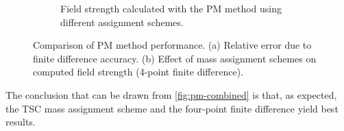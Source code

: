 \begin{figure}[htp]
\begin{subfigure}[t]{0.48\textwidth}
        \caption{Field strength calculated with the PM method using different assignment schemes.}
        \label{fig:pm-mass-assignment-field-strength}
    \end{subfigure}
    \caption{Comparison of PM method performance. (a) Relative error due to finite difference accuracy. (b) Effect of mass assignment schemes on computed field strength (4-point finite difference).}
    \label{fig:pm-combined}
\end{figure}
The conclusion that can be drawn from \autoref{fig:pm-combined} is that, as expected, the TSC mass assignment scheme and the four-point finite difference yield best results.
